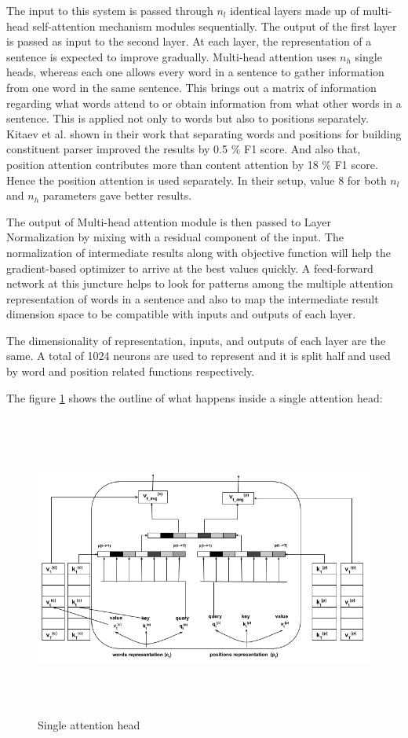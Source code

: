 \documentclass[a4paper, 11pt]{article}
\begin{document}
The input to this system is passed through $n_l$ identical layers made up of multi-head self-attention mechanism modules sequentially. The output of the first layer is passed as input to the second layer. At each layer, the representation of a sentence is expected to improve gradually. Multi-head attention uses $n_h$ single heads, whereas each one allows every word in a sentence to gather information from one word in the same sentence. This brings out a matrix of information regarding what words attend to or obtain information from what other words in a sentence. This is applied not only to words but also to positions separately. Kitaev et al. \parencite*{Kitaev2019} shown in their work that separating words and positions for building constituent parser improved the results by 0.5 \% F1 score. And also that, position attention contributes more than content attention by 18 \% F1 score. Hence the position attention is used separately. In their setup, value 8 for both $n_l$ and $n_h$ parameters gave better results. 

The output of Multi-head attention module is then passed to Layer Normalization by mixing with a residual component of the input. The normalization of intermediate results along with objective function will help the gradient-based optimizer to arrive at the best values quickly. A feed-forward network at this juncture helps to look for patterns among the multiple attention representation of words in a sentence and also to map the intermediate result dimension space to be compatible with inputs and outputs of each layer.  

The dimensionality of representation, inputs, and outputs of each layer are the same. A total of 1024 neurons are used to represent and it is split half and used by word and position related functions respectively. 


The figure \ref{fig:single_attention_head} shows the outline of what happens inside a single attention head:

\begin{figure}[htpb]
    \centering
    \includegraphics[width=\textwidth,height=10cm,keepaspectratio=true]
    {single-head-attention.png}
    \caption{
        Single attention head
    }
    \label{fig:single_attention_head}
\end{figure}
\end{document}

